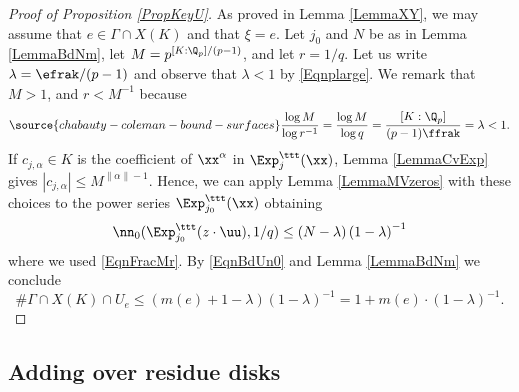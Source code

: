 \begin{proof}[Proof of Proposition \ref{PropKeyU}] As proved in Lemma \ref{LemmaXY}, we may assume that $e\in \Gamma\cap X(K)$ and that $\xi=e$. Let $j_0$ and $N$ be as in Lemma \ref{LemmaBdNm}, let $M=p^{[K:\Q_p]/(p-1)}$, and let $r=1/q$. Let us write $\lambda=\efrak/(p-1)$ and observe that $\lambda<1$ by \eqref{Eqnplarge}. We remark that $M>1$, and $r<M^{-1}$ because
\begin{equation}\label{EqnFracMr}
\source{chabauty-coleman-bound-surfaces}
\frac{\log M}{\log r^{-1}} =\frac{\log M}{\log q} = \frac{[K:\Q_p]}{(p-1)\ffrak} = \lambda<1.
\end{equation}
If $c_{j,\alpha}\in K$ is the coefficient of $\xx^\alpha$ in $\Exp^\ttt_{j}(\xx)$, Lemma \ref{LemmaCvExp} gives $|c_{j,\alpha}| \le M^{\| \alpha\|-1}$. Hence, we can apply Lemma \ref{LemmaMVzeros} with these choices to the power series $\Exp^\ttt_{j_0}(\xx)$ obtaining
$$
\nn_0(\Exp_{j_0}^\ttt(z\cdot \uu), 1/q)\le \left(N-\lambda\right)\left(1-\lambda\right)^{-1}
$$
where we used \eqref{EqnFracMr}. By \eqref{EqnBdUn0} and Lemma \ref{LemmaBdNm} we conclude
$$
\# \Gamma\cap X(K)\cap U_e \le  \left(m(e)+1-\lambda\right)\left(1-\lambda\right)^{-1}=1+ m(e)\cdot \left(1-\lambda\right)^{-1}.
$$
\end{proof}



\subsection{Adding over residue disks}


